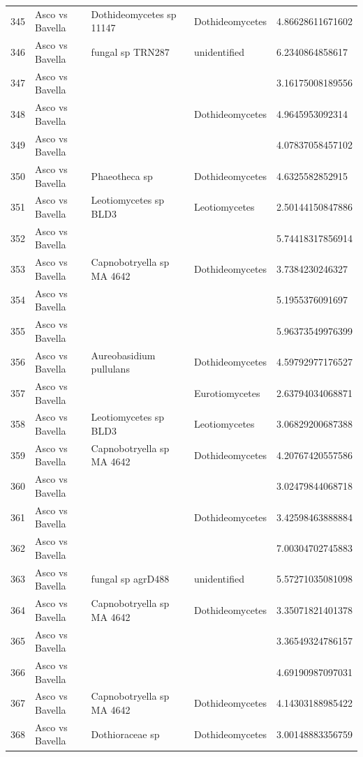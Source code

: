 \documentclass[12pt]{article}\usepackage[]{graphicx}\usepackage[]{color}
\numberwithin{figure}{section}
\begin{document}
\begin{table}[ht]
\begin{tabular}{lllll}
  345 & Asco vs Bavella & Dothideomycetes sp 11147 & Dothideomycetes & 4.86628611671602 \\ 
  346 & Asco vs Bavella & fungal sp TRN287 & unidentified & 6.2340864858617 \\ 
  347 & Asco vs Bavella &  &  & 3.16175008189556 \\ 
  348 & Asco vs Bavella &  & Dothideomycetes & 4.9645953092314 \\ 
  349 & Asco vs Bavella &  &  & 4.07837058457102 \\ 
  350 & Asco vs Bavella & Phaeotheca sp & Dothideomycetes & 4.6325582852915 \\ 
  351 & Asco vs Bavella & Leotiomycetes sp BLD3 & Leotiomycetes & 2.50144150847886 \\ 
  352 & Asco vs Bavella &  &  & 5.74418317856914 \\ 
  353 & Asco vs Bavella & Capnobotryella sp MA 4642 & Dothideomycetes & 3.7384230246327 \\ 
  354 & Asco vs Bavella &  &  & 5.1955376091697 \\ 
  355 & Asco vs Bavella &  &  & 5.96373549976399 \\ 
  356 & Asco vs Bavella & Aureobasidium pullulans & Dothideomycetes & 4.59792977176527 \\ 
  357 & Asco vs Bavella &  & Eurotiomycetes & 2.63794034068871 \\ 
  358 & Asco vs Bavella & Leotiomycetes sp BLD3 & Leotiomycetes & 3.06829200687388 \\ 
  359 & Asco vs Bavella & Capnobotryella sp MA 4642 & Dothideomycetes & 4.20767420557586 \\ 
  360 & Asco vs Bavella &  &  & 3.02479844068718 \\ 
  361 & Asco vs Bavella &  & Dothideomycetes & 3.42598463888884 \\ 
  362 & Asco vs Bavella &  &  & 7.00304702745883 \\ 
  363 & Asco vs Bavella & fungal sp agrD488 & unidentified & 5.57271035081098 \\ 
  364 & Asco vs Bavella & Capnobotryella sp MA 4642 & Dothideomycetes & 3.35071821401378 \\ 
  365 & Asco vs Bavella &  &  & 3.36549324786157 \\ 
  366 & Asco vs Bavella &  &  & 4.69190987097031 \\ 
  367 & Asco vs Bavella & Capnobotryella sp MA 4642 & Dothideomycetes & 4.14303188985422 \\ 
  368 & Asco vs Bavella & Dothioraceae sp & Dothideomycetes & 3.00148883356759 \\ 

\end{tabular}
\end{table}
\end{document}
